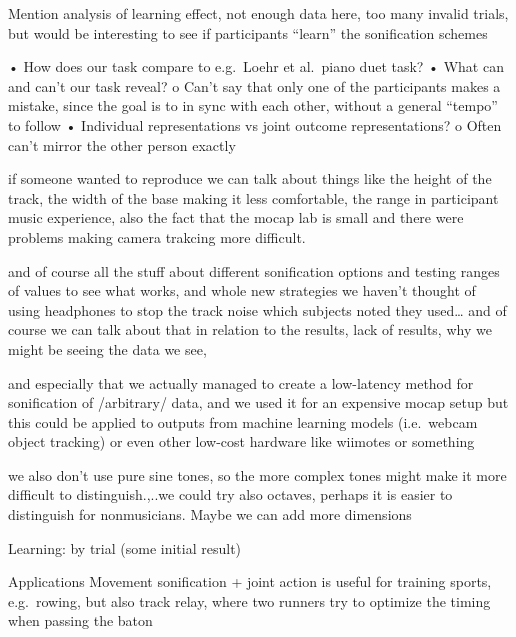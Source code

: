 \documentclass[10pt,a4paper,onecolumn]{article}
\begin{document}
Mention analysis of learning effect, not enough data here, too many invalid trials, but would be interesting to see if participants ``learn'' the sonification schemes

• How does our task compare to e.g.~Loehr et al.~piano duet task?
• What can and can't our task reveal?
o Can't say that only one of the participants makes a mistake, since the goal is to in sync with each other, without a general ``tempo'' to follow
• Individual representations vs joint outcome representations?
o Often can't mirror the other person exactly

if someone wanted to reproduce we can talk about things like the height of the track, the width of the base making it less comfortable, the range in participant music experience, also the fact that the mocap lab is small and there were problems making camera trakcing more difficult.

and of course all the stuff about different sonification options and testing ranges of values to see what works, and whole new strategies we haven't thought of using headphones to stop the track noise which subjects noted they used\ldots{}
and of course we can talk about that in relation to the results, lack of results, why we might be seeing the data we see,

and especially that we actually managed to create a low-latency method for sonification of /arbitrary/ data, and we used it for an expensive mocap setup but this could be applied to outputs from machine learning models (i.e.~webcam object tracking) or even other low-cost hardware like wiimotes or something

we also don't use pure sine tones, so the more complex tones might make it more difficult to distinguish.,..we could try also octaves, perhaps it is easier to distinguish for nonmusicians.
Maybe we can add more dimensions

Learning: by trial (some initial result)

Applications
Movement sonification + joint action is useful for training sports, e.g.~rowing, but also track relay, where two runners try to optimize the timing when passing the baton
\end{document}
